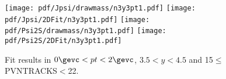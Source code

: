 \begin{figure}[H]
\begin{center}
\texttt{[image: pdf/Jpsi/drawmass/n3y3pt1.pdf]}
\texttt{[image: pdf/Jpsi/2DFit/n3y3pt1.pdf]}
\vspace*{-0.5cm}
\texttt{[image: pdf/Psi2S/drawmass/n3y3pt1.pdf]}
\texttt{[image: pdf/Psi2S/2DFit/n3y3pt1.pdf]}
\vspace*{-0.5cm}
\end{center}
\caption{Fit results in $0\gevc<pt<2\gevc$, $3.5<y<4.5$ and 15$\leq$PVNTRACKS$<$22.}
\label{Fitn3y3pt1}
\end{figure}

